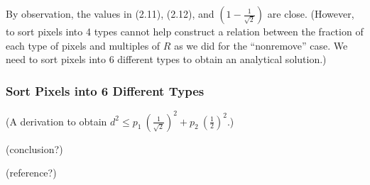 \documentclass[letterpaper]{article}
\numberwithin{equation}{section} %
\numberwithin{figure}{section} %
\numberwithin{table}{section} %
\begin{document}
By observation, the values in (2.11), (2.12), and $(1-\frac{1}{\sqrt{2}})$ are close. (However, to sort pixels into 4 types cannot help construct a relation between the fraction of each type of pixels and multiples of $R$ as we did for the \enquote{nonremove} case. We need to sort pixels into 6 different types to obtain an analytical solution.)

\subsubsection{Sort Pixels into 6 Different Types}

(A derivation to obtain $d^2 \leq p_1 \ (\frac{1}{\sqrt{2}})^2 + p_2 \ (\frac{1}{2})^2 $.)

(conclusion?)

(reference?)
\end{document}
